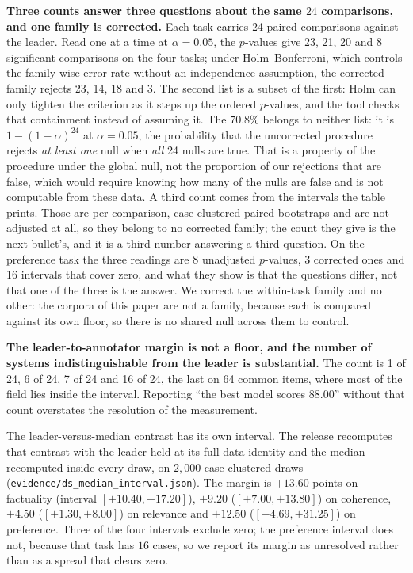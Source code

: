 \documentclass{article}
\newcommand{\ids}[1]{\texttt{\small #1}} %
\begin{document}
\textbf{Three counts answer three questions about the same $24$ comparisons, and one family is corrected.} Each task carries 24 paired comparisons against the leader. Read one at a time at $\alpha = 0.05$, the $p$-values give 23, 21, 20 and 8 significant comparisons on the four tasks; under Holm--Bonferroni, which controls the family-wise error rate without an independence assumption, the corrected family rejects 23, 14, 18 and 3. The second list is a subset of the first: Holm can only tighten the criterion as it steps up the ordered $p$-values, and the tool checks that containment instead of assuming it. The $70.8\%$ belongs to neither list: it is $1-(1-\alpha)^{24}$ at $\alpha=0.05$, the probability that the uncorrected procedure rejects \emph{at least one} null when \emph{all} 24 nulls are true. That is a property of the procedure under the global null, not the proportion of our rejections that are false, which would require knowing how many of the nulls are false and is not computable from these data. A third count comes from the intervals the table prints. Those are per-comparison, case-clustered paired bootstraps and are not adjusted at all, so they belong to no corrected family; the count they give is the next bullet's, and it is a third number answering a third question. On the preference task the three readings are 8 unadjusted $p$-values, 3 corrected ones and 16 intervals that cover zero, and what they show is that the questions differ, not that one of the three is the answer. We correct the within-task family and no other: the corpora of this paper are not a family, because each is compared against its own floor, so there is no shared null across them to control.

\textbf{The leader-to-annotator margin is not a floor, and the number of systems indistinguishable from the leader is substantial.} The count is 1 of 24, 6 of 24, 7 of 24 and 16 of 24, the last on 64 common items, where most of the field lies inside the interval. Reporting ``the best model scores $88.00$'' without that count overstates the resolution of the measurement.

The leader-versus-median contrast has its own interval. The release recomputes that contrast with the leader held at its full-data identity and the median recomputed inside every draw, on $2{,}000$ case-clustered draws (\ids{evidence/ds\_median\_interval.json}). The margin is $+13.60$ points on factuality (interval $[+10.40,+17.20]$), $+9.20$ ($[+7.00,+13.80]$) on coherence, $+4.50$ ($[+1.30,+8.00]$) on relevance and $+12.50$ ($[-4.69,+31.25]$) on preference. Three of the four intervals exclude zero; the preference interval does not, because that task has $16$ cases, so we report its margin as unresolved rather than as a spread that clears zero.
\end{document}
